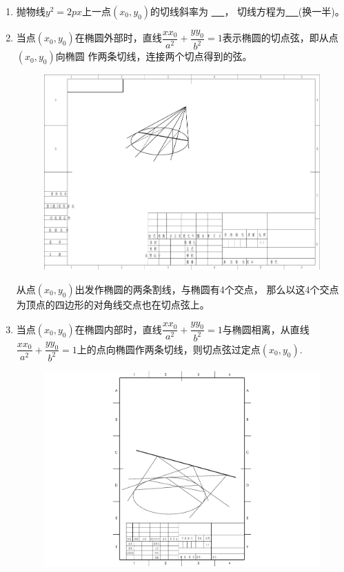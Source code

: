 \documentclass{article}
\newif\ifte
\begin{document}
\begin{multicols}{2}
\begin{enumerate}[leftmargin=20pt]
\item 抛物线$ y^2=2px $上一点$ (x_0,y_0) $的切线斜率为
\underline{\ \ifte $ \dfrac{p}{y_0} $\else \hspace{1cm} \fi\ }，
切线方程为\underline{\ \ifte $ yy_0=p(x+x_0) $
    \else \hspace{2cm} \fi\ }(换一半)。

\item 当点$ (x_0,y_0) $在椭圆外部时，直线$ \dfrac{xx_0}{a^2}+
\dfrac{yy_0}{b^2}=1 $表示椭圆的切点弦，即从点$ (x_0,y_0) $向椭圆
作两条切线，连接两个切点得到的弦。
\begin{figure}[H]
    \centering
    \includegraphics[width=0.4\linewidth]{椭圆-极点极线}
\end{figure}
从点$ (x_0,y_0) $出发作椭圆的两条割线，与椭圆有4个交点，
那么以这4个交点为顶点的四边形的对角线交点也在切点弦上。

\item 当点$ (x_0,y_0) $在椭圆内部时，直线$ \dfrac{xx_0}{a^2}+
\dfrac{yy_0}{b^2}=1 $与椭圆相离，从直线$ \dfrac{xx_0}{a^2}+
\dfrac{yy_0}{b^2}=1 $上的点向椭圆作两条切线，则切点弦过定点$ (x_0,y_0) $.
\begin{figure}[H]
    \centering
    \includegraphics[width=0.5\linewidth]{配极原理-切点弦过定点}
\end{figure}


\end{enumerate}
\end{multicols}
\end{document}

